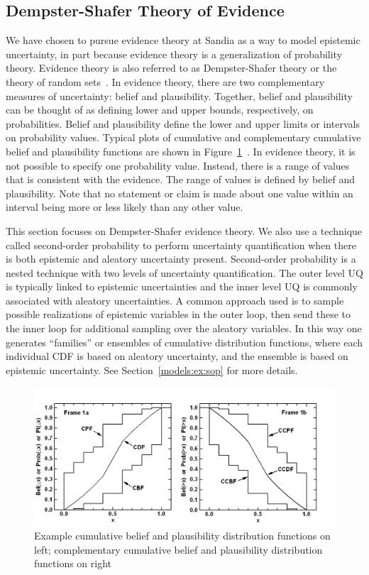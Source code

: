 \subsection{Dempster-Shafer Theory of Evidence}\label{uq:dempshaf}
We have chosen to pursue evidence theory at Sandia as a way to 
model epistemic uncertainty, in part because evidence theory is
a generalization of probability theory.  Evidence theory is also
referred to as Dempster-Shafer theory or the theory of random
sets~\cite{Obe03}.  In evidence theory, there are two complementary
measures of uncertainty: belief and plausibility.  Together, belief
and plausibility can be thought of as defining lower and upper bounds,
respectively, on probabilities.  Belief and plausibility define the
lower and upper limits or intervals on probability values. 
Typical plots of cumulative and complementary cumulative 
belief and plausibility functions are shown in 
Figure~\ref{uq:figure15}~\cite{Hel07}.  
In evidence theory, it is not possible to specify one probability value.
Instead, there is a range of values that is consistent with the
evidence. The range of values is defined by belief and
plausibility. Note that no statement or claim is made about one value
within an interval being more or less likely than any other value.

This section focuses on Dempster-Shafer evidence theory.  We also 
use a technique called second-order probability to perform 
uncertainty quantification when there is both epistemic and 
aleatory uncertainty present.  Second-order probability is a nested 
technique with two levels of uncertainty quantification.  
The outer level UQ is typically linked 
to epistemic uncertainties and the inner level UQ is commonly associated 
with aleatory uncertainties.  A common approach used is to sample 
possible realizations of epistemic variables in the outer loop, 
then send these to the inner loop for additional sampling over the aleatory 
variables.  In this way one generates ``families'' or ensembles of 
cumulative distribution functions, where each individual CDF is based on 
aleatory uncertainty, and the ensemble is based on epistemic uncertainty. 
See Section~\ref{models:ex:sop} for more details.

\begin{figure}
  \centering 
  \includegraphics[scale=0.8]{images/belief_plaus} 
  \caption{Example cumulative belief and plausibility distribution functions on left; complementary cumulative belief and plausibility distribution functions on right}
  \label{uq:figure15}
\end{figure}

